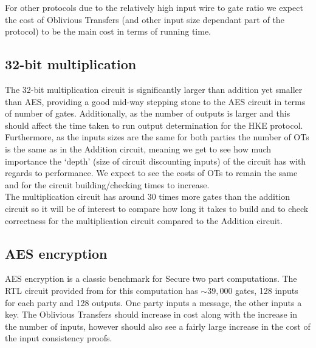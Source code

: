 \documentclass[ %
                    author={Nicholas Tutte},
                supervisor={Prof. Nigel Smart},
                    degree={MEng},
                     title={Secure Two Party Computation},
                  subtitle={A practical comparison of recent protocols},
                      type={Research - GG1K},
                      year={2015} ]{dissertation}
\begin{document}
				For other protocols due to the relatively high input wire to gate ratio we expect the cost of Oblivious Transfers (and other input size dependant part of the protocol) to be the main cost in terms of running time.

			\subsection{32-bit multiplication}

				The 32-bit multiplication circuit is significantly larger than addition yet smaller than AES, providing a good mid-way stepping stone to the AES circuit in terms of number of gates. Additionally, as the number of outputs is larger and this should affect the time taken to run output determination for the HKE protocol.\\

				Furthermore, as the inputs sizes are the same for both parties the number of OTs is the same as in the Addition circuit, meaning we get to see how much importance the `depth' (size of circuit discounting inputs) of the circuit has with regards to performance. We expect to see the costs of OTs to remain the same and for the circuit building/checking times to increase.\\
				
				The multiplication circuit has around $30$ times more gates than the addition circuit so it will be of interest to compare how long it takes to build and to check correctness for the multiplication circuit compared to the Addition circuit.

			\subsection{AES encryption}

				AES encryption is a classic benchmark for Secure two part computations. The RTL circuit provided from \cite{NigelCircuits} for this computation has $\sim 39,000$ gates, 128 inputs for each party and 128 outputs. One party inputs a message, the other inputs a key. The Oblivious Transfers should increase in cost along with the increase in the number of inputs, however should also see a fairly large increase in the cost of the input consistency proofs.

\end{document}
